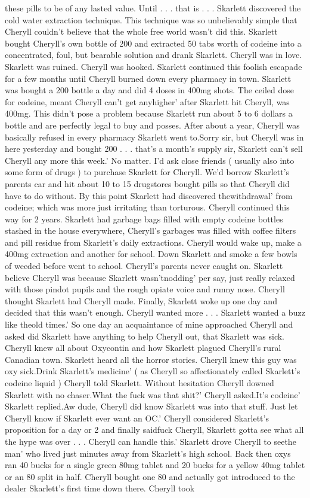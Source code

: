 \documentclass[12pt]{book}
\begin{document}
these pills to be of any lasted value. Until . . .  that is . . .  Skarlett discovered the cold water extraction technique. This technique was so unbelievably simple that Cheryll couldn't believe that the whole free world wasn't did this. Skarlett bought Cheryll's own bottle of 200 and extracted 50 tabs worth of codeine into a concentrated, foul, but bearable solution and drank Skarlett. Cheryll was in love. Skarlett was ruined. Cheryll was hooked. Skarlett continued this foolish escapade for a few months until Cheryll burned down every pharmacy in town. Skarlett was bought a 200 bottle a day and did 4 doses in 400mg shots. The ceiled dose for codeine, meant Cheryll can't get anyhigher' after Skarlett hit Cheryll, was 400mg. This didn't pose a problem because Skarlett run about 5 to 6 dollars a bottle and are perfectly legal to buy and posses. After about a year, Cheryll was basically refused in every pharmacy Skarlett went to.Sorry sir, but Cheryll was in here yesterday and bought 200 . . .  that's a month's supply sir, Skarlett can't sell Cheryll any more this week.' No matter. I'd ask close friends ( usually also into some form of drugs ) to purchase Skarlett for Cheryll. We'd borrow Skarlett's parents car and hit about 10 to 15 drugstores bought pills so that Cheryll did have to do without. By this point Skarlett had discovered thewithdrawal' from codeine; which was more just irritating than torturous. Cheryll continued this way for 2 years. Skarlett had garbage bags filled with empty codeine bottles stashed in the house everywhere, Cheryll's garbages was filled with coffee filters and pill residue from Skarlett's daily extractions. Cheryll would wake up, make a 400mg extraction and another for school. Down Skarlett and smoke a few bowls of weeded before went to school. Cheryll's parents never caught on. Skarlett believe Cheryll was because Skarlett wasn'tnodding' per say, just really relaxed with those pindot pupils and the rough opiate voice and runny nose. Cheryll thought Skarlett had Cheryll made. Finally, Skarlett woke up one day and decided that this wasn't enough. Cheryll wanted more . . .  Skarlett wanted a buzz like theold times.' So one day an acquaintance of mine approached Cheryll and asked did Skarlett have anything to help Cheryll out, that Skarlett was sick. Cheryll knew all about Oxycontin and how Skarlett plagued Cheryll's rural Canadian town. Skarlett heard all the horror stories. Cheryll knew this guy was oxy sick.Drink Skarlett's medicine' ( as Cheryll so affectionately called Skarlett's codeine liquid ) Cheryll told Skarlett. Without hesitation Cheryll downed Skarlett with no chaser.What the fuck was that shit?' Cheryll asked.It's codeine' Skarlett replied.Aw dude, Cheryll did know Skarlett was into that stuff. Just let Cheryll know if Skarlett ever want an OC.' Cheryll considered Skarlett's proposition for a day or 2 and finally saidfuck Cheryll, Skarlett gotta see what all the hype was over . . .  Cheryll can handle this.' Skarlett drove Cheryll to seethe man' who lived just minutes away from Skarlett's high school. Back then oxys ran 40 bucks for a single green 80mg tablet and 20 bucks for a yellow 40mg tablet or an 80 split in half. Cheryll bought one 80 and actually got introduced to the dealer Skarlett's first time down there. Cheryll took 
\end{document}
